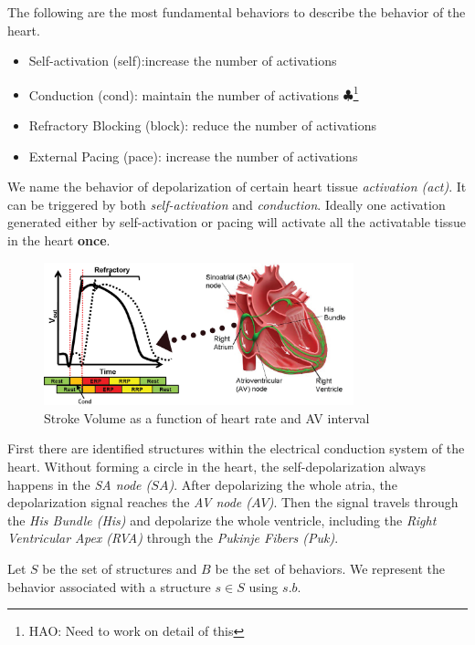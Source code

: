 \documentclass{llncs}
\newcommand{\Hao}[1]{$\clubsuit$\footnote{HAO: #1}}
\begin{document}
The following are the most fundamental behaviors to describe the behavior of the heart.
\begin{itemize}
	\item Self-activation (self):increase the number of activations
    \item Conduction (cond): maintain the number of activations \Hao{Need to work on detail of this}
    \item Refractory Blocking (block): reduce the number of activations
    \item External Pacing (pace): increase the number of activations

\end{itemize}


We name the behavior of depolarization of certain heart tissue \emph{activation (act)}. It can be triggered by both \emph{self-activation} and \emph{conduction}. Ideally one activation generated either by self-activation or pacing will activate all the activatable tissue in the heart \textbf{once}.
\begin{figure}[!t]
		\centering
		\includegraphics[width=0.8\textwidth]{figs/basic.png}
		\caption{\small Stroke Volume as a function of heart rate and AV interval}
		\label{fig:SV}
\end{figure}

First there are identified structures within the electrical conduction system of the heart. Without forming a circle in the heart, the self-depolarization always happens in the \emph{SA node ($SA$)}. After depolarizing the whole atria, the depolarization signal reaches the \emph{AV node ($AV$)}. Then the signal travels through the \emph{His Bundle (His)} and depolarize the whole ventricle, including the \emph{Right Ventricular Apex (RVA)} through the \emph{Pukinje Fibers (Puk)}. 

Let $S$ be the set of structures and $B$ be the set of behaviors. We represent the behavior associated with a structure $s\in S$ using $s.b$. 
\end{document}
